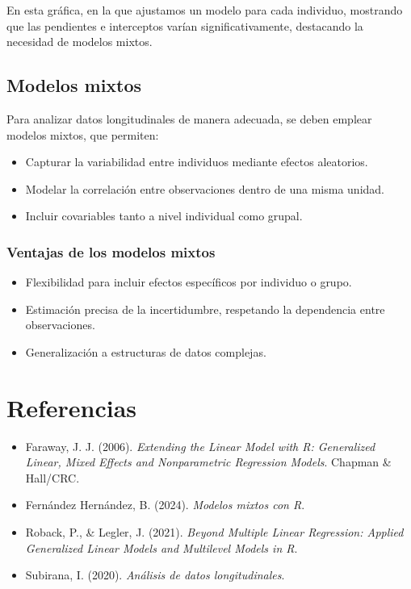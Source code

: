 \documentclass[
  letterpaper,
  DIV=11,
  numbers=noendperiod]{scrreprt}
\providecommand{\tightlist}{%
  \setlength{\itemsep}{0pt}\setlength{\parskip}{0pt}}\usepackage{longtable,booktabs,array}
\newlength{\cslhangindent}
\newenvironment{CSLReferences}[2] %
 {\begin{list}{}{%
  \setlength{\itemindent}{0pt}
  \setlength{\leftmargin}{0pt}
  \setlength{\parsep}{0pt}
  \ifodd #1
   \setlength{\leftmargin}{\cslhangindent}
   \setlength{\itemindent}{-1\cslhangindent}
  \fi
  \setlength{\itemsep}{#2\baselineskip}}}
 {\end{list}}
\begin{document}
En esta gráfica, en la que ajustamos un modelo para cada individuo,
mostrando que las pendientes e interceptos varían significativamente,
destacando la necesidad de modelos mixtos.

\section{Modelos mixtos}\label{modelos-mixtos}

Para analizar datos longitudinales de manera adecuada, se deben emplear
modelos mixtos, que permiten:

\begin{itemize}
\tightlist
\item
  Capturar la variabilidad entre individuos mediante efectos aleatorios.
\item
  Modelar la correlación entre observaciones dentro de una misma unidad.
\item
  Incluir covariables tanto a nivel individual como grupal.
\end{itemize}

\subsection{Ventajas de los modelos
mixtos}\label{ventajas-de-los-modelos-mixtos}

\begin{itemize}
\tightlist
\item
  Flexibilidad para incluir efectos específicos por individuo o grupo.
\item
  Estimación precisa de la incertidumbre, respetando la dependencia
  entre observaciones.
\item
  Generalización a estructuras de datos complejas.
\end{itemize}


\chapter*{Referencias}\label{referencias}


\label{refs}
\begin{CSLReferences}{0}{1}
\begin{itemize}
\item
  Faraway, J. J. (2006). \emph{Extending the Linear Model with R:
  Generalized Linear, Mixed Effects and Nonparametric Regression
  Models}. Chapman \& Hall/CRC.
\item
  Fernández Hernández, B. (2024). \emph{Modelos mixtos con R}.
\item
  Roback, P., \& Legler, J. (2021). \emph{Beyond Multiple Linear
  Regression: Applied Generalized Linear Models and Multilevel Models in
  R}.
\item
  Subirana, I. (2020). \emph{Análisis de datos longitudinales}.
\end{itemize}

\end{CSLReferences}
\end{document}
